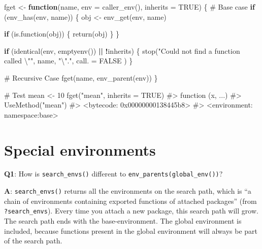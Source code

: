\documentclass[
]{krantz}
\makeatletter
\newenvironment{Shaded}{\begin{snugshade}}{\end{snugshade}}
\newcommand{\CharTok}[1]{\textcolor[rgb]{0.31,0.60,0.02}{#1}}
\newcommand{\CommentTok}[1]{\textcolor[rgb]{0.56,0.35,0.01}{\textit{#1}}}
\newcommand{\ControlFlowTok}[1]{\textcolor[rgb]{0.13,0.29,0.53}{\textbf{#1}}}
\newcommand{\DataTypeTok}[1]{\textcolor[rgb]{0.13,0.29,0.53}{#1}}
\newcommand{\DecValTok}[1]{\textcolor[rgb]{0.00,0.00,0.81}{#1}}
\newcommand{\KeywordTok}[1]{\textcolor[rgb]{0.13,0.29,0.53}{\textbf{#1}}}
\newcommand{\NormalTok}[1]{#1}
\newcommand{\OperatorTok}[1]{\textcolor[rgb]{0.81,0.36,0.00}{\textbf{#1}}}
\newcommand{\OtherTok}[1]{\textcolor[rgb]{0.56,0.35,0.01}{#1}}
\newcommand{\StringTok}[1]{\textcolor[rgb]{0.31,0.60,0.02}{#1}}
\newenvironment{kframe}{%
\medskip{}
\setlength{\fboxsep}{.8em}
 \def\at@end@of@kframe{}%
 \ifinner\ifhmode%
  \def\at@end@of@kframe{\end{minipage}}%
  \begin{minipage}{\columnwidth}%
 \fi\fi%
 \def\FrameCommand##1{\hskip\@totalleftmargin \hskip-\fboxsep
 \colorbox{shadecolor}{##1}\hskip-\fboxsep
     \hskip-\linewidth \hskip-\@totalleftmargin \hskip\columnwidth}%
 \MakeFramed {\advance\hsize-\width
   \@totalleftmargin\z@ \linewidth\hsize
   \@setminipage}}%
 {\par\unskip\endMakeFramed%
 \at@end@of@kframe}
\renewenvironment{Shaded}{\begin{kframe}}{\end{kframe}}
\renewcommand{\KeywordTok} [1]{\textcolor[rgb]{0.00,0.44,0.13}{{#1}}}
\renewcommand{\DataTypeTok}[1]{\textcolor[rgb]{0.56,0.13,0.00}{{#1}}}
\renewcommand{\DecValTok}  [1]{\textcolor[rgb]{0.25,0.63,0.44}{{#1}}}
\renewcommand{\CharTok}    [1]{\textcolor[rgb]{0.25,0.44,0.63}{{#1}}}
\renewcommand{\StringTok}  [1]{\textcolor[rgb]{0.25,0.44,0.63}{{#1}}}
\renewcommand{\CommentTok} [1]{\textcolor[rgb]{0.38,0.63,0.69}{{#1}}}
\renewcommand{\OtherTok}   [1]{\textcolor[rgb]{0.00,0.44,0.13}{{#1}}}
\renewcommand{\NormalTok}  [1]{{#1}}
\makeatother
\begin{document}
\begin{Shaded}
\begin{Highlighting}[]
\NormalTok{fget <-}\StringTok{ }\ControlFlowTok{function}\NormalTok{(name, }\DataTypeTok{env =} \KeywordTok{caller_env}\NormalTok{(), }\DataTypeTok{inherits =} \OtherTok{TRUE}\NormalTok{) \{}
  \CommentTok{# Base case}
  \ControlFlowTok{if}\NormalTok{ (}\KeywordTok{env_has}\NormalTok{(env, name)) \{}
\NormalTok{    obj <-}\StringTok{ }\KeywordTok{env_get}\NormalTok{(env, name)}

    \ControlFlowTok{if}\NormalTok{ (}\KeywordTok{is.function}\NormalTok{(obj)) \{}
      \KeywordTok{return}\NormalTok{(obj)}
\NormalTok{    \}}
\NormalTok{  \}}

  \ControlFlowTok{if}\NormalTok{ (}\KeywordTok{identical}\NormalTok{(env, }\KeywordTok{emptyenv}\NormalTok{()) }\OperatorTok{||}\StringTok{ }\OperatorTok{!}\NormalTok{inherits) \{}
    \KeywordTok{stop}\NormalTok{(}\StringTok{"Could not find a function called }\CharTok{\textbackslash{}"}\StringTok{"}\NormalTok{, name, }\StringTok{"}\CharTok{\textbackslash{}"}\StringTok{."}\NormalTok{,}
      \DataTypeTok{call. =} \OtherTok{FALSE}
\NormalTok{    )}
\NormalTok{  \}}

  \CommentTok{# Recursive Case}
  \KeywordTok{fget}\NormalTok{(name, }\KeywordTok{env_parent}\NormalTok{(env))}
\NormalTok{\}}

\CommentTok{# Test}
\NormalTok{mean <-}\StringTok{ }\DecValTok{10}
\KeywordTok{fget}\NormalTok{(}\StringTok{"mean"}\NormalTok{, }\DataTypeTok{inherits =} \OtherTok{TRUE}\NormalTok{)}
\CommentTok{#> function (x, ...) }
\CommentTok{#> UseMethod("mean")}
\CommentTok{#> <bytecode: 0x00000000138445b8>}
\CommentTok{#> <environment: namespace:base>}
\end{Highlighting}
\end{Shaded}

\hypertarget{special-environments}{%
\section{Special environments}\label{special-environments}}

\textbf{{Q1}}: How is \texttt{search\_envs()} different to \texttt{env\_parents(global\_env())}?

\textbf{{A}}: \texttt{search\_envs()} returns all the environments on the search path, which is ``a chain of environments containing exported functions of attached packages'' (from \texttt{?search\_envs}). Every time you attach a new package, this search path will grow. The search path ends with the base-environment. The global environment is included, because functions present in the global environment will always be part of the search path.
\end{document}
